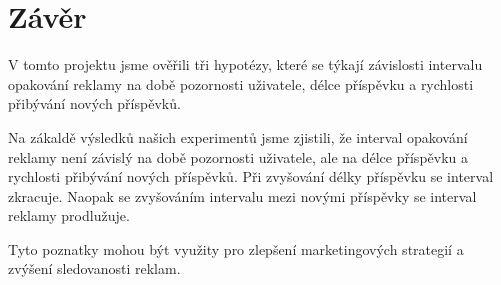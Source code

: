 \documentclass[11pt, a4paper]{article}
\begin{document}
\section{Závěr}
V tomto projektu jsme ověřili tři hypotézy, které se týkají závislosti intervalu opakování reklamy na době pozornosti uživatele, délce příspěvku a rychlosti přibývání nových příspěvků.

Na zákaldě výsledků našich experimentů jsme zjistili, že interval opakování reklamy není závislý na době pozornosti uživatele, ale na délce příspěvku a rychlosti přibývání nových příspěvků.
Při zvyšování délky příspěvku se interval zkracuje.
Naopak se zvyšováním intervalu mezi novými příspěvky se interval reklamy prodlužuje.

Tyto poznatky mohou být využity pro zlepšení marketingových strategií a zvýšení sledovanosti reklam. 



    
\end{document}
